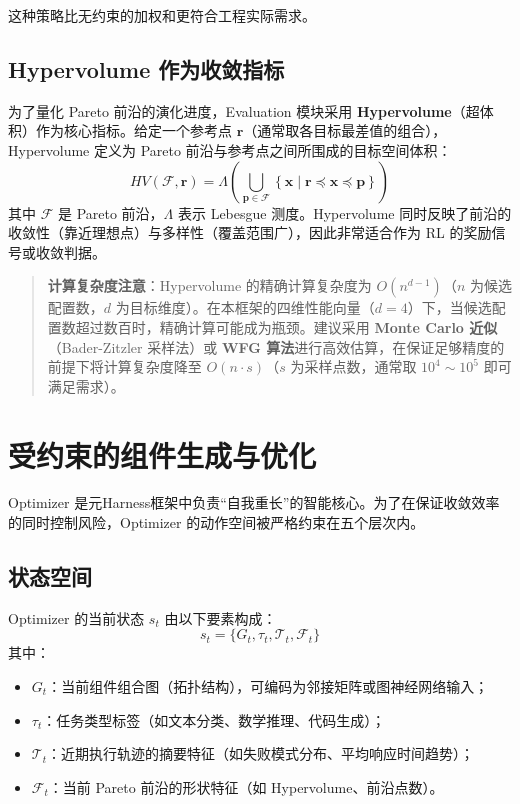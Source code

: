 这种策略比无约束的加权和更符合工程实际需求。

\subsection{Hypervolume 作为收敛指标}

为了量化 Pareto 前沿的演化进度，Evaluation 模块采用 \textbf{Hypervolume}（超体积）作为核心指标。给定一个参考点 $\mathbf{r}$（通常取各目标最差值的组合），Hypervolume 定义为 Pareto 前沿与参考点之间所围成的目标空间体积：
\begin{equation}
HV(\mathcal{F}, \mathbf{r}) = \Lambda\left( \bigcup_{\mathbf{p} \in \mathcal{F}} \left\{ \mathbf{x} \mid \mathbf{r} \preceq \mathbf{x} \preceq \mathbf{p} \right\} \right)
\end{equation}
其中 $\mathcal{F}$ 是 Pareto 前沿，$\Lambda$ 表示 Lebesgue 测度。Hypervolume 同时反映了前沿的收敛性（靠近理想点）与多样性（覆盖范围广），因此非常适合作为 RL 的奖励信号或收敛判据。

\begin{quote}
\textbf{计算复杂度注意}：Hypervolume 的精确计算复杂度为 $O(n^{d-1})$（$n$ 为候选配置数，$d$ 为目标维度）。在本框架的四维性能向量（$d=4$）下，当候选配置数超过数百时，精确计算可能成为瓶颈。建议采用 \textbf{Monte Carlo 近似}（Bader-Zitzler 采样法）或 \textbf{WFG 算法}进行高效估算，在保证足够精度的前提下将计算复杂度降至 $O(n \cdot s)$（$s$ 为采样点数，通常取 $10^4 \sim 10^5$ 即可满足需求）。
\end{quote}

\section{受约束的组件生成与优化}

Optimizer 是元Harness框架中负责“自我重长”的智能核心。为了在保证收敛效率的同时控制风险，Optimizer 的动作空间被严格约束在五个层次内。

\subsection{状态空间}

Optimizer 的当前状态 $s_t$ 由以下要素构成：
\begin{equation}
s_t = \{ G_t, \tau_t, \mathcal{T}_t, \mathcal{F}_t \}
\end{equation}
其中：
\begin{itemize}
    \item $G_t$：当前组件组合图（拓扑结构），可编码为邻接矩阵或图神经网络输入；
    \item $\tau_t$：任务类型标签（如文本分类、数学推理、代码生成）；
    \item $\mathcal{T}_t$：近期执行轨迹的摘要特征（如失败模式分布、平均响应时间趋势）；
    \item $\mathcal{F}_t$：当前 Pareto 前沿的形状特征（如 Hypervolume、前沿点数）。
\end{itemize}

